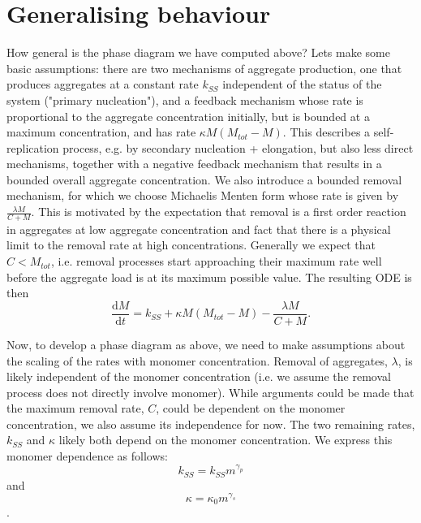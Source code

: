 \section{Generalising behaviour}
How general is the phase diagram we have computed above? Lets make some basic assumptions: there are two mechanisms of aggregate production, one that produces aggregates at a constant rate $k_{SS}$ independent of the status of the system ("primary nucleation"), and a feedback mechanism whose rate is proportional to the aggregate concentration initially, but is bounded at a maximum concentration, and has rate $\kappa M (M_{tot}-M)$. This describes a self-replication process, e.g. by secondary nucleation + elongation, but also less direct mechanisms, together with a negative feedback mechanism that results in a bounded overall aggregate concentration. We also introduce a bounded removal mechanism, for which we choose Michaelis Menten form  whose rate is given by $\frac{\lambda M}{C+M}$. This is motivated by the expectation that removal is a first order reaction in aggregates at low aggregate concentration and fact that there is a physical limit to the removal rate at high concentrations. Generally we expect that $C<M_{tot}$, i.e. removal processes start approaching their maximum rate well before the aggregate load is at its maximum possible value. The resulting ODE is then
\begin{equation}
    \frac{\text{d}M}{\text{d}t} = k_{SS} + \kappa M (M_{tot}-M) - \frac{\lambda M}{C+M}.
\end{equation}

Now, to develop a phase diagram as above, we need to make assumptions about the scaling of the rates with monomer concentration. Removal of aggregates, $\lambda$, is likely independent of the monomer concentration (i.e. we assume the removal process does not directly involve monomer). While arguments could be made that the maximum removal rate, $C$, could be dependent on the monomer concentration, we also assume its independence for now. The two remaining rates, $k_{SS}$ and $\kappa$ likely both depend on the monomer concentration. We express this monomer dependence as follows:
\begin{equation}
   k_{SS} =  k_{SS} m^{\gamma_p}
\end{equation}
and
\begin{equation}
   \kappa =  \kappa_0 m^{\gamma_s}
\end{equation}.

